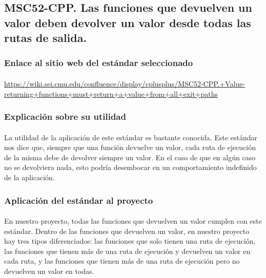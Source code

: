 			
		
	\subsection{MSC52-CPP. Las funciones que devuelven un valor deben devolver un valor desde todas las rutas de salida.}
	
		\subsubsection{Enlace al sitio web del estándar seleccionado}
		
			\paragraph{}\url{https://wiki.sei.cmu.edu/confluence/display/cplusplus/MSC52-CPP.+Value-returning+functions+must+return+a+value+from+all+exit+paths}
		
		\subsubsection{Explicación sobre su utilidad}
		
			\paragraph{}La utilidad de la aplicación de este estándar es bastante conocida. Este estándar nos dice que, siempre que una función devuelve un valor, cada ruta de ejecución de la misma debe de devolver siempre un valor. En el caso de que en algún caso no se devolviera nada, esto podría desembocar en un comportamiento indefinido de la aplicación.
		
		\subsubsection{Aplicación del estándar al proyecto}
		
			\paragraph{}En nuestro proyecto, todas las funciones que devuelven un valor cumplen con este estándar. Dentro de las funciones que devuelven un valor, en nuestro proyecto hay tres tipos diferenciados: las funciones que solo tienen una ruta de ejecución, las funciones que tienen más de una ruta de ejecución y devuelven un valor en cada ruta, y las funciones que tienen más de una ruta de ejecución pero no devuelven un valor en todas.
			
